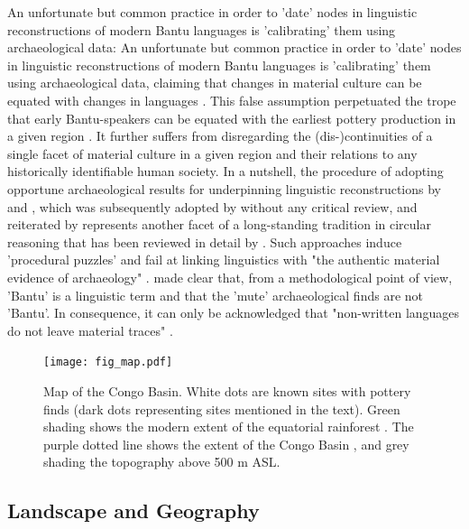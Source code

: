 \documentclass[smallextended,natbib]{svjour3}       %
\begin{document}
An unfortunate but common practice in order to 'date' nodes in linguistic reconstructions of modern Bantu languages is 'calibrating' them using archaeological data: An unfortunate but common practice in order to 'date' nodes in linguistic reconstructions of modern Bantu languages is 'calibrating' them using archaeological data, claiming that changes in material culture can be equated with changes in languages \citep[see][]{Bostoen.2015,Grollemund.2015,Grollemund.2023,Koile.2022}. This false assumption perpetuated the trope that early Bantu-speakers can be equated with the earliest pottery production in a given region \citep[355, 362, 364]{Bostoen.2015}. It further suffers from disregarding the (dis-)continuities of a single facet of material culture in a given region and their relations to any historically identifiable human society. In a nutshell, the procedure of adopting opportune archaeological results for underpinning linguistic reconstructions by \citet{Grollemund.2015} and \citet{Bostoen.2015}, which was subsequently adopted by \citet[SI]{Koile.2022} without any critical review, and reiterated by \citet{Grollemund.2023} represents another facet of a long-standing tradition in circular reasoning \citep{Ehret.1973,Phillipson.1976,Phillipson.1976b,Phillipson.1977a,Heine.1977} that has been reviewed in detail by \citet[82]{Eggert.2005,Eggert.2016a}. Such approaches induce 'procedural puzzles' and fail at linking linguistics with "the authentic material evidence of archaeology" \citep[88]{Eggert.2016a}. \citet[129]{deMaret.1989} made clear that, from a methodological point of view, 'Bantu' is a linguistic term and that the 'mute' archaeological finds are not 'Bantu'. In consequence, it can only be acknowledged that "non-written languages do not leave material traces" \citep[85]{Eggert.2016a}.

\begin{figure}[!tb]
	\texttt{[image: fig\_map.pdf]}
	\caption{Map of the Congo Basin. White dots are known sites with pottery finds (dark dots representing sites mentioned in the text). Green shading shows the modern extent of the equatorial rainforest \citep{White.1983}. The purple dotted line shows the extent of the Congo Basin \citep[11]{Runge.2001}, and grey shading the topography above 500 m ASL.}
	\label{fig:map}
\end{figure}

\subsection*{Landscape and Geography}
\end{document}
